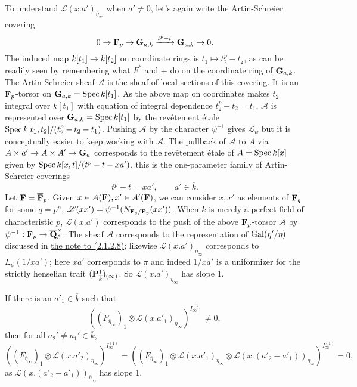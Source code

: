 \documentclass[deligne.tex]{subfiles}
\begin{document}
To understand $\mathscr L(x.a')_{\overline\eta_\infty}$ when $a'\ne0$,
let's again write the Artin-Schreier covering
\begin{equation*}
	0\rightarrow\mathbf{F}_p\rightarrow\mathbf{G}_{a,k}\xrightarrow{t^p-t}\mathbf{G}_{a,k}\rightarrow0.
\end{equation*}
The induced map $k[t_1]\rightarrow k[t_2]$ on coordinate rings is
$t_1\mapsto t_2^p-t_2$, as can be readily seen by remembering what $F^*$
and $+$ do on the coordinate ring of $\mathbf{G}_{a,k}$. The Artin-Schreier sheaf
$\mathcal A$ is the sheaf of local sections of this covering.
It is an $\mathbf{F}_p$-torsor on $\mathbf{G}_{a,k}=\operatorname{Spec} k[t_1]$. As the above map on
coordinates makes $t_2$ integral over $k[t_1]$ with equation of integral
dependence $t_2^p-t_2=t_1$, $\mathcal A$ is represented over
$\mathbf{G}_{a,k}=\operatorname{Spec} k[t_1]$ by the revêtement étale
$\operatorname{Spec} k[t_1,t_2]/(t_2^p-t_2-t_1)$.
Pushing $\mathcal A$ by the character $\psi^{-1}$ gives $\mathscr L_{\psi}$
but it is conceptually easier to keep working with $\mathcal A$.
The pullback of $\mathcal A$ to $A$ via $A\times a'\rightarrow A\times A'\rightarrow\mathbf{G}_a$
corresponds to the revêtement étale of $A=\operatorname{Spec} k[x]$ given by
$\operatorname{Spec} k[x,t]/(t^p-t-xa')$, this is the one-parameter family of
Artin-Schreier coverings
\begin{equation*}
	t^p-t=xa',\qquad a'\in\overline k.
\end{equation*}
Let $\mathbf{F}=\overline{\mathbf{F}}_p$.
Given $x\in A(\mathbf{F}),x'\in A'(\mathbf{F})$, we can consider 
$x,x'$ as elements of $\mathbf{F}_q$ for some $q=p^n$,
$\mathscr L(xx')=\psi^{-1}(N_{\mathbf{F}_q/\mathbf{F}_p}(xx'))$.
When $k$ is merely a perfect field of characteristic $p$, $\mathscr L(x.a')$
corresponds to the push of the above $\mathbf{F}_p$-torsor $\mathcal A$ by
$\psi^{-1}:\mathbf{F}_p\rightarrow\overline{\mathbf{Q}}_\ell^\times$. The sheaf
$\mathcal A$ corresponds to the representation of $\operatorname{Gal}(\eta'/\eta)$
discussed in \hyperref[laumon:2.1.2]{the note to (2.1.2.8)};
likewise $\mathscr L(x.a')_{\overline\eta_\infty}$ corresponds to
$L_{\psi}(1/xa')$; here $xa'$ corresponds to $\pi$ and indeed
$1/xa'$ is a uniformizer for the strictly henselian trait
$(\mathbf{P}^1_{\overline k})_{(\infty)}$.
So $\mathscr L(x.a')_{\overline\eta_\infty}$ has slope 1.

If there is an $a'_1\in\overline k$ such that
\begin{equation*}
	((F_{\overline\eta_\infty})_1\otimes\mathscr L(x.a'_1)_{\overline\eta_\infty})^{I_\infty^{(1)}}\ne0,
\end{equation*}
then for all $a_2'\ne a_1'\in\overline k$,
\begin{equation*}
	((F_{\overline\eta_\infty})_1\otimes\mathscr L(x.a'_2)_{\overline\eta_\infty})^{I_\infty^{(1)}}
	=((F_{\overline\eta_\infty})_1\otimes\mathscr L(x.a'_1)_{\overline\eta_\infty}\otimes\mathscr L(x.(a'_2-a'_1))_{\overline\eta_\infty})^{I_\infty^{(1)}}=0,
\end{equation*}
as $\mathscr L(x.(a'_2-a'_1))_{\overline\eta_\infty}$ has slope 1.
\end{document}
